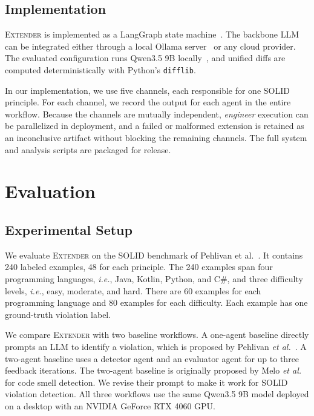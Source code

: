 \documentclass[sigconf,screen]{acmart}
\newcommand{\tool}{\textsc{Extender}\xspace}
\newcommand{\etal}{{\em et al.}\xspace}
\newcommand{\ie}{{\em i.e.},\xspace}
\begin{document}
\subsection{Implementation}
\tool is implemented as a LangGraph state machine~\cite{LangGraph2024}.
The backbone LLM can be integrated either through a local Ollama server~\cite{Ollama2024} or any cloud provider.
The evaluated configuration runs Qwen3.5 9B locally~\cite{Qwen2025}, and unified diffs are computed deterministically with Python's \texttt{difflib}.

In our implementation, we use five channels, each responsible for one SOLID principle.
For each channel, we record the output for each agent in the entire workflow.
Because the channels are mutually independent, \textit{engineer} execution can be parallelized in deployment, and a failed or malformed extension is retained as an inconclusive artifact without blocking the remaining channels.
The full system and analysis scripts are packaged for release.

\section{Evaluation}\label{sec:evaluation}
\subsection{Experimental Setup}
We evaluate \tool on the SOLID benchmark of Pehlivan et al.~\cite{Pehlivan2025}.
It contains 240 labeled examples, 48 for each principle. 
The 240 examples span four programming languages, \ie Java, Kotlin, Python, and C\#, and three difficulty levels, \ie easy, moderate, and hard.
There are 60 examples for each programming language and 80 examples for each difficulty.
Each example has one ground-truth violation label.

We compare \tool with two baseline workflows.
A one-agent baseline directly prompts an LLM to identify a violation, which is proposed by Pehlivan \etal~\cite{Pehlivan2025}.  
A two-agent baseline uses a detector agent and an evaluator agent for up to three feedback iterations.  
The two-agent baseline is originally proposed by Melo \etal~\cite{Melo2025} for code smell detection. 
We revise their prompt to make it work for SOLID violation detection.
All three workflows use the same Qwen3.5 9B model deployed on a desktop with an NVIDIA GeForce RTX 4060 GPU.  
\end{document}
